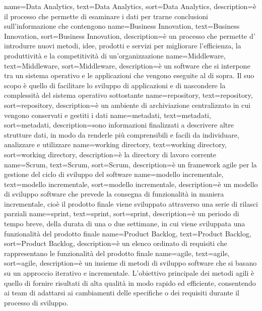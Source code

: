 {
    name={Data Analytics},
    text=Data Analytics,
    sort=Data Analytics,
    description={è il processo che permette di esaminare i dati per trarne conclusioni sull'informazione che contengono}
}
{
    name={Business Innovation},
    text=Business Innovation,
    sort=Business Innovation,
    description={è un processo che permette d' introdurre nuovi metodi, idee, prodotti e servizi per migliorare l'efficienza, la produttività e la competitività di un'organizzazione}
}
{
    name={Middleware},
    text=Middleware,
    sort=Middleware,
    description={è un software che si interpone tra un sistema operativo e le applicazioni che vengono eseguite al di sopra. Il suo scopo è quello di facilitare lo sviluppo di applicazioni e di nascondere la complessità del sistema operativo sottostante}
}
{
    name={repository},
    text=repository,
    sort=repository,
    description={è un ambiente di archiviazione centralizzato in cui vengono conservati e gestiti i dati}
}
{
    name={metadati},
    text=metadati,
    sort=metadati,
    description={sono informazioni finalizzati a descrivere altre strutture dati, in modo da renderle più comprensibili e facili da individuare, analizzare e utilizzare}
}
{
    name={working directory},
    text=working directory,
    sort=working directory,
    description={è la directory di lavoro corrente}
}
{
    name={Scrum},
    text=Scrum,
    sort=Scrum,
    description={è un framework agile per la gestione del ciclo di sviluppo del software}
}
{
    name={modello incrementale},
    text=modello incrementale,
    sort=modello incrementale,
    description={è un modello di sviluppo software che prevede la consegna di funzionalità in maniera incrementale, cioè il prodotto finale viene 
    sviluppato attraverso una serie di rilasci parziali}
}
{
    name={sprint},
    text=sprint,
    sort=sprint,
    description={è un periodo di tempo breve, della durata di una o due settimane, in cui viene sviluppata 
    una funzionalità del prodotto finale}
}
{
    name={Product Backlog},
    text=Product Backlog,
    sort=Product Backlog,
    description={è un elenco ordinato di requisiti che rappresentano le funzionalità del prodotto finale}
}
{
    name={agile},
    text=agile,
    sort=agile,
    description={è un insieme di metodi di sviluppo software che si basano su un approccio iterativo e incrementale. 
    L'obiettivo principale dei metodi agili è quello di fornire risultati di alta qualità in modo rapido ed efficiente, consentendo ai team di adattarsi ai cambiamenti delle specifiche o dei requisiti durante il processo di sviluppo.}
}

